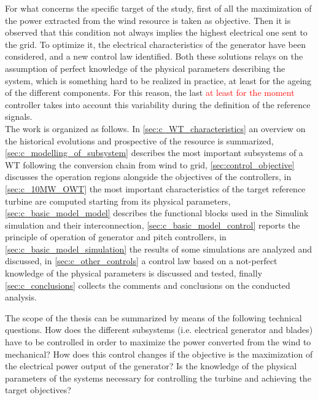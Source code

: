 For what concerns the specific target of the study, first of all the maximization of the power extracted from the wind resource is taken as objective. Then it is observed that this condition not always implies the highest electrical one sent to the grid. To optimize it, the electrical characteristics of the generator have been considered, and a new control law identified. Both these solutions relays on the assumption of perfect knowledge of the physical parameters describing the system, which is something hard to be realized in practice, at least for the ageing of the different components. For this reason, the last \textcolor{red}{at least for the moment} controller takes into account this variability during the definition of the reference signals. \\
The work is organized as follows. In \autoref{sec:c_WT_characteristics} an overview on the historical evolutions and prospective of the resource is summarized, \autoref{sec:c_modelling_of_subsystem} describes the most important subsystems of a WT following the conversion chain from wind to grid, \autoref{sec:control_objective} discusses the operation regions alongside the objectives of the controllers, in \autoref{sec:c_10MW_OWT} the most important characteristics of the target reference turbine are computed starting from its physical parameters, \autoref{sec:c_basic_model_model} describes the functional blocks used in the Simulink simulation and their interconnection, \autoref{sec:c_basic_model_control} reports the principle of operation of generator and pitch controllers, in \autoref{sec:c_basic_model_simulation} the results of some simulations are analyzed and discussed, in \autoref{sec:c_other_controls} a control law based on a not-perfect knowledge of the physical parameters is discussed and tested, finally \autoref{sec:c_conclusions} collects the comments and conclusions on the conducted analysis.

The scope of the thesis can be summarized by means of the following technical questions. How does the different subsystems (i.e. electrical generator and blades) have to be controlled in order to maximize the power converted from the wind to mechanical? How does this control changes if the objective is the maximization of the electrical power output of the generator? Is the knowledge of the physical parameters of the systems necessary for controlling the turbine and achieving the target objectives? 

